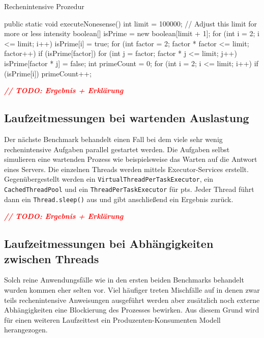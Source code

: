     \begin{program} [H]
        \caption{Rechenintensive Prozedur}
        \label{prog:ExecuteNoneSense}
    \begin{JavaCode}[language=Java, numbers=left]
public static void executeNonesense() {
    int limit = 100000; // Adjust this limit for more or less intensity
    boolean[] isPrime = new boolean[limit + 1];
    for (int i = 2; i <= limit; i++) 
        isPrime[i] = true;
    for (int factor = 2; factor * factor <= limit; factor++) {
        if (isPrime[factor]) {
            for (int j = factor; factor * j <= limit; j++) 
                isPrime[factor * j] = false;
        }
    }
    int primeCount = 0;
    for (int i = 2; i <= limit; i++) {
        if (isPrime[i])
            primeCount++;
    }
}\end{JavaCode}
    \end{program}

    \emph{\textbf{\textcolor{red}{// TODO: Ergebnis + Erklärung}}}

\subsection{Laufzeitmessungen bei wartenden Auslastung}                                         
\label{subsec:LaufzeitmessungenbeiwartendenAuslastung}

    Der nächste Benchmark behandelt einen Fall bei dem viele sehr wenig rechenintensive Aufgaben parallel gestartet werden. Die Aufgaben selbst simulieren eine wartenden Prozess wie beispielsweise das
    Warten auf die Antwort eines Servers. Die einzelnen Threads werden mittels Executor-Services erstellt. Gegenübergestellt werden ein \texttt{VirtualThreadPerTaskExecutor}, ein \texttt{CachedThreadPool}
    und ein \texttt{ThreadPerTaskExecutor} für \Glspl{pt}. Jeder Thread führt dann ein \texttt{Thread.sleep()} aus und gibt anschließend ein Ergebnis zurück. 


    \emph{\textbf{\textcolor{red}{// TODO: Ergebnis + Erklärung}}}

\subsection{Laufzeitmessungen bei Abhängigkeiten zwischen Threads}
\label{subsec:LaufzeitmessungenbeiAbhängigkeitenzwischenThreads}

    Solch reine Anwendungsfälle wie in den ersten beiden Benchmarks behandelt wurden kommen eher selten vor. Viel häufiger treten Mischfälle auf in denen zwar teils rechenintensive Anweisungen ausgeführt werden
    aber zusätzlich noch externe Abhängigkeiten eine Blockierung des Prozesses bewirken. Aus diesem Grund wird für einen weiteren Laufzeittest ein Produzenten-Konsumenten Modell herangezogen. 